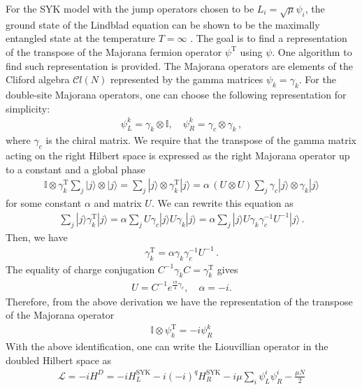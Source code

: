 For the SYK model with the jump operators chosen to be $L_i=\sqrt{\mu}\psi_i$, the ground state of the Lindblad equation can be shown to be the maximally entangled state at the temperature $T=\infty$ \cite{garcia2023keldysh,zanoci2022energy}. The goal is to find a representation of the transpose of the Majorana fermion operator $\psi^\mathrm{T}$ using $\psi$. One algorithm to find such representation is provided. The Majorana operators are elements of the Cliford algebra $\mathcal{C}l(N)$ represented by the gamma matrices $\psi_k=\gamma_k$. For the double-site Majorana operators, one can choose the following representation for simplicity:
\begin{align}
    \psi_L^k=\gamma_k \otimes \mathbb{I}, \quad \psi_R^k=\gamma_c \otimes \gamma_k\,,
\end{align}
where $\gamma_c$ is the chiral matrix. We require that the transpose of the gamma matrix acting on the right Hilbert space is expressed as the right Majorana operator up to a constant and a global phase 
\begin{align}
    \mathbb{I}\otimes \gamma_k^\mathrm{T} \sum_j |j\rangle \otimes |j\rangle = \sum_j |j\rangle \otimes \gamma_k^\mathrm{T}|j\rangle = \alpha\, (U\otimes U) \sum_j \gamma_c |j\rangle \otimes \gamma_k |j\rangle
\end{align}
for some constant $\alpha$ and matrix $U$. We can rewrite this equation as
\begin{align}
   \sum_j |j\rangle \gamma_k^\mathrm{T}|j\rangle= \alpha \sum_j U \gamma_c |j\rangle U \gamma_k |j\rangle= \alpha \sum_j   |j\rangle U \gamma_k \gamma_c^{-1} U^{-1} |j\rangle\,.
\end{align}
Then, we have
\begin{align}
    \gamma_k^\mathrm{T}= \alpha \gamma_k \gamma_c^{-1} U^{-1}\,.
\end{align}
The equality of charge conjugation $C^{-1}\gamma_k C= \gamma_k^\mathrm{T}$ gives
\begin{align}
    U=C^{-1} e^{\frac{i \pi}{4}\gamma_c}, \quad \alpha = -i.
\end{align}
Therefore, from the above derivation we have the representation of the transpose of the Majorana operator
\begin{align}
     \mathbb{I}\otimes \psi_k^\mathrm{T}=-i \psi_R^k
\end{align}
With the above identification, one can write the Liouvillian operator in the doubled Hilbert space as 
\begin{align}
    \mathcal{L}=-i H^D= -i H_L^{\mathrm{SYK}}-i (-i)^q H_R^{\mathrm{SYK}}-i\mu \sum_i \psi_L^i \psi_R^i -\frac{\mu N}{2}
\end{align}

